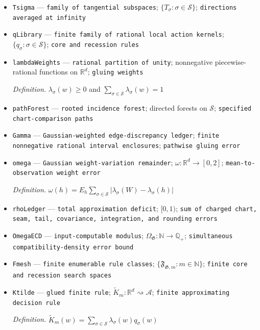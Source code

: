 \documentclass{article}
\begin{document}
\begin{itemize}
  \item \texttt{Tsigma} --- \texttt{family of tangential subspaces}; \(\{T_{\sigma}:\sigma\in\mathcal S\}\); \texttt{directions averaged at infinity}
  \item \texttt{qLibrary} --- \texttt{finite family of rational local action kernels}; \(\{q_{\sigma}:\sigma\in\mathcal S\}\); \texttt{core and recession rules}
  \item \texttt{lambdaWeights} --- \texttt{rational partition of unity}; nonnegative piecewise-rational functions on \(\mathbb R^d\); \texttt{gluing weights}
  \par\smallskip\noindent\emph{Definition.} \(\lambda_{\sigma}(w)\ge0\) and \(\sum_{\sigma\in\mathcal S}\lambda_{\sigma}(w)=1\)
  \item \texttt{pathForest} --- \texttt{rooted incidence forest}; directed forests on \(\mathcal S\); \texttt{specified chart-\allowbreak{}comparison paths}
  \item \texttt{Gamma} --- \texttt{Gaussian-\allowbreak{}weighted edge-\allowbreak{}discrepancy ledger}; \texttt{finite nonnegative rational interval enclosures}; \texttt{pathwise gluing error}
  \item \texttt{omega} --- \texttt{Gaussian weight-\allowbreak{}variation remainder}; \(\omega:\mathbb R^d\to[0,2]\); \texttt{mean-\allowbreak{}to-\allowbreak{}observation weight error}
  \par\smallskip\noindent\emph{Definition.} \(\omega(h)=E_h\sum_{\sigma\in\mathcal S}|\lambda_{\sigma}(W)-\lambda_{\sigma}(h)|\)
  \item \texttt{rhoLedger} --- \texttt{total approximation deficit}; \([0,1)\); \texttt{sum of charged chart,\allowbreak{} seam,\allowbreak{} tail,\allowbreak{} covariance,\allowbreak{} integration,\allowbreak{} and rounding errors}
  \item \texttt{OmegaECD} --- \texttt{input-\allowbreak{}computable modulus}; \(\Omega_{\mathfrak G}:\mathbb N\to\mathbb Q_{+}\); \texttt{simultaneous compatibility-\allowbreak{}density error bound}
  \item \texttt{Fmesh} --- \texttt{finite enumerable rule classes}; \(\{\mathfrak F_{\mathfrak G,m}:m\in\mathbb N\}\); \texttt{finite core and recession search spaces}
  \item \texttt{Ktilde} --- \texttt{glued finite rule}; \(\widetilde K_m:\mathbb R^d\rightsquigarrow\mathcal A\); \texttt{finite approximating decision rule}
  \par\smallskip\noindent\emph{Definition.} \(\widetilde K_m(w)=\sum_{\sigma\in\mathcal S}\lambda_{\sigma}(w)q_{\sigma}(w)\)

\end{itemize}
\end{document}
